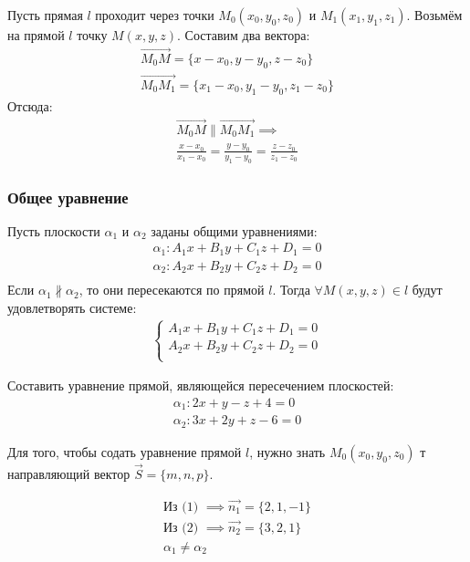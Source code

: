 Пусть прямая $l$ проходит через точки $M_0(x_0, y_0, z_0)$ и $M_1(x_1, y_1, z_1)$.
Возьмём на прямой $l$ точку  $M(x, y, z)$.
Составим два вектора:
\begin{gather*}
  \overrightarrow{M_0M} = \{x - x_0, y - y_0, z - z_0\} \\ 
  \overrightarrow{M_0M_1} = \{x_1 - x_0, y_1 - y_0, z_1 - z_0\}
\end{gather*}
Отсюда:
\begin{gather*}
  \overrightarrow{M_0M} \parallel  \overrightarrow{M_0M_1} \implies \\
  \boxed{
    \frac{x - x_0}{x_1 - x_0} = \frac{y - y_0}{y_1 - y_0} = \frac{z - z_0}{z_1 - z_0}
  }
\end{gather*}

\subsubsection{Общее уравнение}

Пусть плоскости $\alpha_1$ и $\alpha_2$ заданы общими уравнениями:
\begin{gather*}
  \alpha_1: A_1x + B_1y + C_1z + D_1 = 0 \\
  \alpha_2: A_2x + B_2y + C_2z + D_2 = 0 \\
\end{gather*}
Если $\alpha_1 \not \parallel \alpha_2$, то они пересекаются по прямой $l$.
Тогда $\forall M(x, y, z) \in l$ будут удовлетворять системе:
\begin{gather*}
  \boxed{
    \begin{cases}
      A_1x + B_1y + C_1z + D_1 = 0 \\
      A_2x + B_2y + C_2z + D_2 = 0 \\
    \end{cases}
  }
\end{gather*}

\begin{eg}
  Составить уравнение прямой, являющейся пересечением плоскостей:
  \begin{gather*}
    \alpha_1: 2x + y - z + 4 = 0 \\
    \alpha_2: 3x + 2y + z - 6 = 0
  \end{gather*}
\end{eg}

Для того, чтобы содать уравнение прямой $l$, нужно знать  $M_0(x_0, y_0, z_0)$ т направляющий вектор $\vec{S} = \{m, n, p\}$.

\begin{gather*}
  \text{Из (1) } \implies \vec{n_1} = \{2, 1, -1\} \\ 
  \text{Из (2) } \implies \vec{n_2} = \{3, 2, 1\} \\
  \alpha_1 \neq \alpha_2
\end{gather*}

